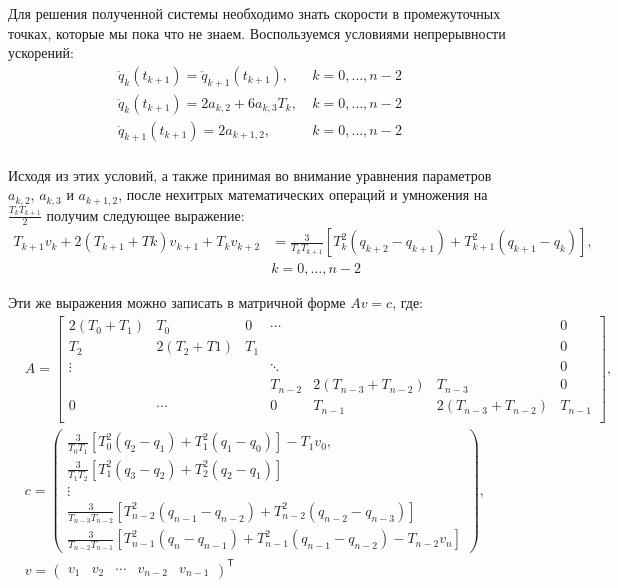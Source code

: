 Для решения полученной системы необходимо знать скорости в промежуточных точках, которые мы пока что не знаем. Воспользуемся условиями непрерывности ускорений:
\begin{align*}
	\ddot{q}_{k}(t_{k+1}) = \ddot{q}_{k+1}(t_{k+1}),		&\		k=0,\dotsc,n-2\\
	\ddot{q}_{k}(t_{k+1}) = 2a_{k,2} + 6a_{k,3}T_{k},		&\		k=0,\dotsc,n-2\\
	\ddot{q}_{k+1}(t_{k+1}) = 2a_{k+1,2},					&\		k=0,\dotsc,n-2\\
\end{align*}

Исходя из этих условий, а также принимая во внимание уравнения параметров $a_{k,2}$, $a_{k,3}$ и $a_{k+1,2}$, после нехитрых математических операций и умножения на $\frac{T_{k}T_{k+1}}{2}$ получим следующее выражение:
\begin{align*}
	T_{k+1}v_{k} + 2(T_{k+1}+T{k})v_{k+1} + T_{k}v_{k+2} &= \frac{3}{T_{k}T_{k+1}}[T_{k}^{2}(q_{k+2} - q_{k+1}) + T_{k+1}^{2}(q_{k+1} - q_{k})],\\
	&k=0,\dotsc,n-2
\end{align*}

Эти же выражения можно записать в матричной форме $Av = c$, где:
\begin{align*}
	&A = 
	\begin{bmatrix}
		2(T_{0} + T_{1})	&	T_{0}			&		0	&	\dotsm	&							&						&	0\\
		T_{2}				&	2(T_{2} + T{1})	&	T_{1}	&			&							&						&	0\\
		\vdots				&					&			& 	\ddots	&							&						&	0\\
							&					&			&	T_{n-2}	&	2(T_{n-3} + T_{n-2})	&	T_{n-3}				&	0\\
		0					&			\dotsm	&			&		0	&	T_{n-1}					& 2(T_{n-3} + T_{n-2})	&	T_{n-1}\\
	\end{bmatrix},
\\
	&c =
	\begin{pmatrix}
		\frac{3}{T_{0}T_{1}}[T_{0}^{2}(q_{2} - q_{1}) + T_{1}^{2}(q_{1} - q_{0})] - T_{1}v_{0},\\
		\frac{3}{T_{1}T_{2}}[T_{1}^{2}(q_{3} - q_{2}) + T_{2}^{2}(q_{2} - q_{1})]\\
		\vdots	\\
		\frac{3}{T_{n-3}T_{n-2}}[T_{n-2}^{2}(q_{n-1} - q_{n-2}) + T_{n-2}^{2}(q_{n-2} - q_{n-3})]\\
		\frac{3}{T_{n-2}T_{n-1}}[T_{n-1}^{2}(q_{n} - q_{n-1}) + T_{n-1}^{2}(q_{n-1} - q_{n-2}) - T_{n-2}v_{n}] 
	\end{pmatrix},
\\
	&v =
	\begin{pmatrix}
		v_{1}	&	v_{2}	&	\dotsm	&	v_{n-2}	&	v_{n-1}
	\end{pmatrix}^\mathsf{T}
\end{align*}

